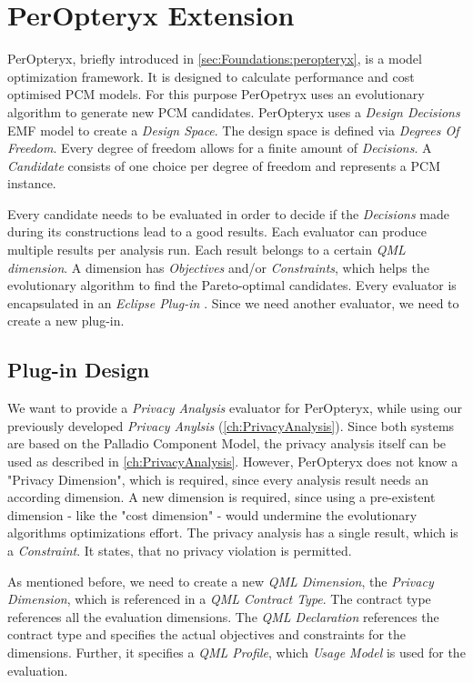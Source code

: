 \chapter{PerOpteryx Extension}
\label{ch:PerOpt}

PerOpteryx, briefly introduced in \autoref{sec:Foundations:peropteryx}, is a model optimization framework. It is designed to calculate performance and cost optimised PCM models. For this purpose PerOpetryx uses an evolutionary algorithm to generate new PCM candidates. PerOpteryx uses a \textit{Design Decisions} EMF model to create a \textit{Design Space}. The design space is defined via \textit{Degrees Of Freedom}. Every degree of freedom allows for a finite amount of \textit{Decisions}. A \textit{Candidate} consists of one choice per degree of freedom and represents a PCM instance. 

Every candidate needs to be evaluated in order to decide if the \textit{Decisions} made during its constructions lead to a good results. Each evaluator can produce multiple results per analysis run. Each result belongs to a certain \textit{QML dimension}. A dimension has \textit{Objectives} and/or \textit{Constraints}, which helps the evolutionary algorithm to find the Pareto-optimal candidates. Every evaluator is encapsulated in an \textit{Eclipse Plug-in} \cite{PerOpteryx.b}. Since we need another evaluator, we need to create a new plug-in.

\section{Plug-in Design}
\label{sec:PerOpt:design}

We want to provide a \textit{Privacy Analysis} evaluator for PerOpteryx, while using our previously developed \textit{Privacy Anylsis} (\autoref{ch:PrivacyAnalysis}). Since both systems are based on the Palladio Component Model, the privacy analysis itself can be used as described in \autoref{ch:PrivacyAnalysis}. However, PerOpteryx does not know a "Privacy Dimension", which is required, since every analysis result needs an according dimension. A new dimension is required, since using a pre-existent dimension - like the "cost dimension" - would undermine the evolutionary algorithms optimizations effort. The privacy analysis has a single result, which is a \textit{Constraint}. It states, that no privacy violation is permitted.

As mentioned before, we need to create a new \textit{QML Dimension}, the \textit{Privacy Dimension}, which is referenced in a \textit{QML Contract Type}. The contract type references all the evaluation dimensions. The \textit{QML Declaration} references the contract type and specifies the actual objectives and constraints for the dimensions. Further, it specifies a \textit{QML Profile}, which \textit{Usage Model} is used for the evaluation.


